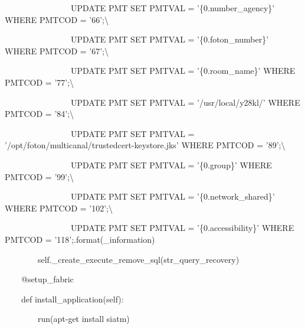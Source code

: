 {\ttfamily\color[rgb]{0.10980392,0.10980392,0.10980392}
    \ \ \ \ \ \ \ \ \ \ \ \ \ \ \ \ UPDATE PMT SET PMTVAL = '\{0.number\_agency\}' WHERE PMTCOD = '66';{\textbackslash}}

{\ttfamily\color[rgb]{0.10980392,0.10980392,0.10980392}
    \ \ \ \ \ \ \ \ \ \ \ \ \ \ \ \ UPDATE PMT SET PMTVAL = '\{0.foton\_number\}' WHERE PMTCOD = '67';{\textbackslash}}

{\ttfamily\color[rgb]{0.10980392,0.10980392,0.10980392}
    \ \ \ \ \ \ \ \ \ \ \ \ \ \ \ \ UPDATE PMT SET PMTVAL = '\{0.room\_name\}' WHERE PMTCOD = '77';{\textbackslash}}

{\ttfamily\color[rgb]{0.10980392,0.10980392,0.10980392}
    \ \ \ \ \ \ \ \ \ \ \ \ \ \ \ \ UPDATE PMT SET PMTVAL = '/usr/local/y28kl/' WHERE PMTCOD = '84';{\textbackslash}}

{\ttfamily\color[rgb]{0.10980392,0.10980392,0.10980392}
    \ \ \ \ \ \ \ \ \ \ \ \ \ \ \ \ UPDATE PMT SET PMTVAL = '/opt/foton/multicanal/trustedcert-keystore.jks' WHERE PMTCOD =
        '89';{\textbackslash}}

{\ttfamily\color[rgb]{0.10980392,0.10980392,0.10980392}
    \ \ \ \ \ \ \ \ \ \ \ \ \ \ \ \ UPDATE PMT SET PMTVAL = '\{0.group\}' WHERE PMTCOD = '99';{\textbackslash}}

{\ttfamily\color[rgb]{0.10980392,0.10980392,0.10980392}
    \ \ \ \ \ \ \ \ \ \ \ \ \ \ \ \ UPDATE PMT SET PMTVAL = '\{0.network\_shared\}' WHERE PMTCOD = '102';{\textbackslash}}

{\ttfamily\color[rgb]{0.10980392,0.10980392,0.10980392}
    \ \ \ \ \ \ \ \ \ \ \ \ \ \ \ \ UPDATE PMT SET PMTVAL = '\{0.accessibility\}' WHERE PMTCOD =
        '118';{\textquotedbl}{\textquotedbl}{\textquotedbl}.format(\_information)}


        \bigskip

{\ttfamily\color[rgb]{0.10980392,0.10980392,0.10980392}
    \ \ \ \ \ \ \ \ self.\_create\_execute\_remove\_sql(str\_query\_recovery)}


    \bigskip

{\ttfamily\color[rgb]{0.10980392,0.10980392,0.10980392}
    \ \ \ \ @setup\_fabric}

{\ttfamily\color[rgb]{0.10980392,0.10980392,0.10980392}
    \ \ \ \ def install\_application(self):}

{\ttfamily\color[rgb]{0.10980392,0.10980392,0.10980392}
    \ \ \ \ \ \ \ \ run({\textquotedbl}apt-get install siatm{\textquotedbl})}


    \bigskip

